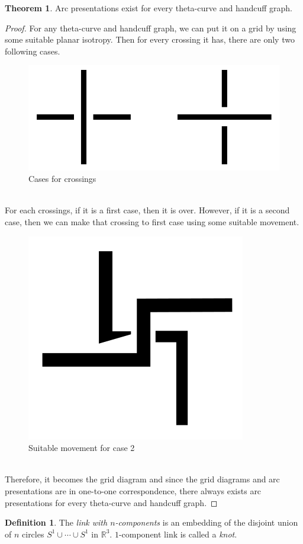 \documentclass{article}
\theoremstyle{definition}
\newtheorem{defn}[thm]{Definition}
\theoremstyle{theorem}
\newtheorem{theorem}[thm]{Theorem}
\theoremstyle{proposition}
\theoremstyle{corollary}
\begin{document}
\begin{theorem}
    Arc presentations exist for every theta-curve and handcuff graph. 
\end{theorem}
\begin{proof}
    For any theta-curve and handcuff graph, we can put it on a grid by using some suitable planar isotropy.
    Then for every crossing it has, there are only two following cases. \\
    \begin{figure}[h]
        \centerline{\includegraphics[width=0.5\linewidth]{figure/crossings.png}}
        \caption{Cases for crossings}
        \label{figure_2}
    \end{figure}
    \\ For each crossings, if it is a first case, then it is over.
    However, if it is a second case, then we can make that crossing to first case using some suitable movement. \\
    \begin{figure}[h]
        \centerline{\includegraphics[width=0.25\linewidth]{figure/move crossing.png}}
        \caption{Suitable movement for case 2}
        \label{figure_2}
    \end{figure}
    \\ Therefore, it becomes the grid diagram and since the grid diagrams and arc presentations are in one-to-one correspondence, there always exists arc presentations for every theta-curve and handcuff graph.
\end{proof}

\begin{defn}
    The \textit{link with $n$-components} is an embedding of the disjoint union of $n$ circles $S^1 \cup \cdots \cup S^1$ in $\mathbb{R}^3$. $1$-component link is called a \textit{knot}.
\end{defn}
\end{document}

